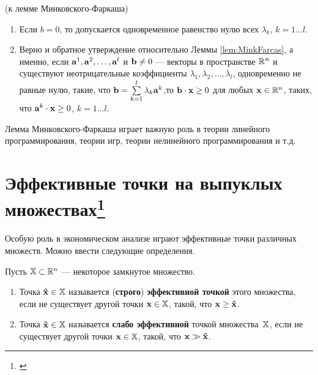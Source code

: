 \begin{note}(к лемме Минковского-Фаркаша)

\begin{enumerate}
\renewcommand{\theenumi}{(\alph{enumi})}

  \item Если $b=0$, то допускается одновременное равенство нулю всех
  $\lambda_k$, $k=1 \ldots l$.

  \item Верно и обратное утверждение относительно Леммы \ref{lem:MinkFarcas},
  а именно, если $\mathbf{a}^1, \mathbf{a}^2, \ldots, \mathbf{a}^l$ и $\mathbf{b}\neq0$
  ---  векторы в пространстве $\mathbb{R}^n$ и существуют неотрицательные
   коэффициенты $\lambda_1, \lambda_2, \ldots, \lambda_l$,
   одновременно не равные нулю, такие, что $\mathbf{b}=\sum\limits_{k=1}^l{\lambda_k
   \mathbf{a}^k}$,то $\mathbf{b} \cdot \mathbf{x} \geq 0$ для любых $\mathbf{x} \in \mathbb{R}^n$, таких,
   что $\mathbf{a}^k \cdot \mathbf{x} \geq 0$, $k=1 \ldots l$.

\end{enumerate}

\end{note}



Лемма Минковского-Фаркаша играет важную роль в теории линейного
программирования, теории игр, теории нелинейного программирования и
т.д.

\newpage

\section{Эффективные точки на выпуклых
множествах\protect\footnote{\cite{Takayama:1985}}}

Особую роль в экономическом анализе играют эффективные точки
различных множеств. Можно ввести следующие определения.

\begin{dfn}

Пусть $\mathbb{X} \subset \mathbb{R}^n$ --- некоторое замкнутое множество.

\begin{enumerate}
  \item Точка ${\mathbf{\hat x}} \in \mathbb{X} $ называется (\textbf{строго}) \textbf{эффективной
точкой} этого множества, если не существует другой точки $\mathbf{x} \in
\mathbb{X}$, такой, что $\mathbf{x} \geq \mathbf{\hat x}$.

  \item Точка $\mathbf{\tilde x} \in \mathbb{X}$ называется \textbf{слабо эффективной} точкой
множества~$\mathbb{X}$, если не существует другой точки $\mathbf{x} \in
\mathbb{X}$, такой, что $\mathbf{x} \gg \mathbf{\tilde x}$.

\end{enumerate}
\end{dfn}

